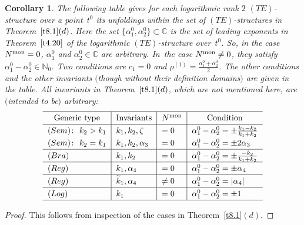 \documentclass[10pt,a4paper]{amsart}
\numberwithin{equation}{section}
\numberwithin{figure}{section}
\newcommand{\N}{{\mathbb N}}
\newcommand{\C}{{\mathbb C}}
\newcommand{\www}{\widetilde}
\newtheorem{Corollary}[Theorem]{Corollary}
\begin{document}
\begin{Corollary}\label{t8.3}
The following table gives for each logarithmic rank $2$
$(TE)$-structure over a point~$t^0$ its unfoldings within
the set of $(TE)$-structures in Theorem~$\ref{t8.1}(d)$.
Here the set $\big\{\alpha_1^0,\alpha_2^0\big\}\subset\C$ is the
set of leading exponents in Theorem~$\ref{t4.20}$ of the
logarithmic $(TE)$-structure over~$t^0$.
So, in the case $N^{\rm mon}=0$, $\alpha_1^0$ and $\alpha_2^0\in\C$
are arbitrary. In~the case $N^{\rm mon}\neq 0$, they satisfy
$\alpha_1^0-\alpha_2^0\in\N_0$. Two conditions are
$c_1=0$ and $\rho^{(1)}=\frac{\alpha_1^0+\alpha_2^0}{2}$.
The other conditions and the other invariants
$($though without their definition domains$)$
are given in the table.
All invariants in Theorem~$\ref{t8.1}(d)$, which are not
mentioned here, are $($intended to be$)$ arbitrary:
\begin{gather}\label{8.11}
\def\arraystretch{1.25}
\begin{tabular}{l|l|l|l}
\hline
\multicolumn{1}{c|}{Generic type}&\multicolumn{1}{c|}{Invariants} & \multicolumn{1}{c|}{$N^{\rm mon}$} &\multicolumn{1}{c}{Condition}
\\
\hline
$(Sem)\colon\ k_2>k_1$ & $k_1,k_2,\zeta$ & $=0$&
$\alpha_1^0-\alpha_2^0=\pm \frac{k_1-k_2}{k_1+k_2}$
\\
$(Sem)\colon\ k_2=k_1$ & $k_1,k_2,\alpha_3$ & $=0$&
$\alpha_1^0-\alpha_2^0=\pm 2\alpha_3$
\\
\hline
$(Bra)$ & $k_1,k_2$ &$ =0$&$\alpha_1^0-\alpha_2^0=\pm \frac{-k_2}{k_1+k_2} $
\\
\hline
$(Reg)$ & $k_1,\alpha_4$ & $=0$ &$\alpha_1^0-\alpha_2^0=\pm \alpha_4$
\\
\hline
$(Reg)$ & $\www k_1,\alpha_4$ & $\neq 0$ &$\alpha_1^0-\alpha_2^0=|\alpha_4| $
\\
\hline
$(Log)$ &$ k_1$ & $=0$ & $\alpha_1^0-\alpha_2^0=\pm 1$
\\
\hline
\end{tabular}
\end{gather}
\end{Corollary}

\begin{proof} This follows from inspection of the cases
in Theorem~\ref{t8.1}$(d)$.
\end{proof}
\end{document}
